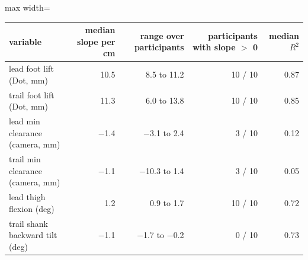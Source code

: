 \begin{adjustbox}{max width=\textwidth}
{\footnotesize
\begin{tabular}{p{5.4cm}rrrr}
\toprule
\textbf{variable} & \textbf{median slope per cm} & \textbf{range over participants} & \textbf{participants with slope $>$ 0} & \textbf{median $R^2$} \\
\midrule
lead foot lift (Dot, mm) & 10.5 & 8.5 to 11.2 & 10 / 10 & 0.87 \\
trail foot lift (Dot, mm) & 11.3 & 6.0 to 13.8 & 10 / 10 & 0.85 \\
lead min clearance (camera, mm) & $-$1.4 & $-$3.1 to 2.4 & 3 / 10 & 0.12 \\
trail min clearance (camera, mm) & $-$1.1 & $-$10.3 to 1.4 & 3 / 10 & 0.05 \\
lead thigh flexion (deg) & 1.2 & 0.9 to 1.7 & 10 / 10 & 0.72 \\
trail shank backward tilt (deg) & $-$1.1 & $-$1.7 to $-$0.2 & 0 / 10 & 0.73 \\
\bottomrule
\end{tabular}
}
\end{adjustbox}

